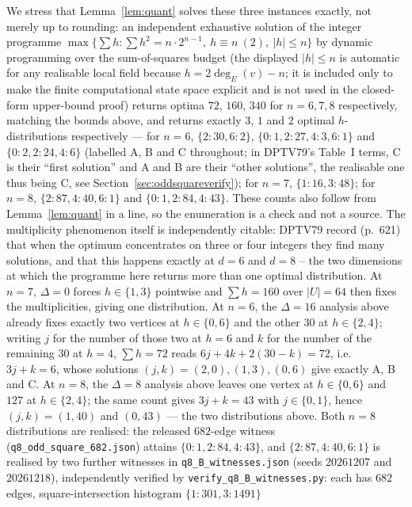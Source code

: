 \documentclass[12pt,a4paper]{article}
\theoremstyle{definition}
\begin{document}
We stress that Lemma~\ref{lem:quant} solves these three instances
exactly, not merely up to rounding: an independent exhaustive solution
of the integer programme
$\max\{\sum h : \sum h^2=n\cdot2^{n-1},\ h\equiv n\ (2),\ |h|\le n\}$
by dynamic programming over the sum-of-squares budget (the displayed
$|h|\le n$ is automatic for any realisable local field because
$h=2\deg_E(v)-n$; it is included only to make the finite computational
state space explicit and is not used in the closed-form upper-bound proof) returns optima
$72$, $160$, $340$ for $n=6,7,8$ respectively, matching the bounds
above, and returns exactly $3$, $1$ and $2$ optimal $h$-distributions
respectively --- for $n=6$,
$\{2{:}30,6{:}2\}$, $\{0{:}1,2{:}27,4{:}3,6{:}1\}$ and
$\{0{:}2,2{:}24,4{:}6\}$ (labelled A, B and C throughout; in DPTV79's
Table~I terms, C is their ``first solution'' and A and B are their ``other
solutions'', the realisable one thus being C, see
Section~\ref{sec:oddsquareverify}); for $n=7$, $\{1{:}16,3{:}48\}$; for $n=8$,
$\{2{:}87,4{:}40,6{:}1\}$ and $\{0{:}1,2{:}84,4{:}43\}$.
These counts also follow from Lemma~\ref{lem:quant} in a line, so the
enumeration is a check and not a source. The multiplicity phenomenon itself
is independently citable: DPTV79 record (p.~621) that when the optimum
concentrates on three or four integers they find many solutions, and that
this happens exactly at $d=6$ and $d=8$ -- the two dimensions at which the
programme here returns more than one optimal distribution. At $n=7$, $\Delta=0$ forces
$h\in\{1,3\}$ pointwise and $\sum h=160$ over $|U|=64$ then fixes the
multiplicities, giving one distribution. At $n=6$, the $\Delta=16$ analysis
above already fixes exactly two vertices at $h\in\{0,6\}$ and the other
$30$ at $h\in\{2,4\}$; writing $j$ for the number of those two at $h=6$ and
$k$ for the number of the remaining $30$ at $h=4$, $\sum h=72$ reads
$6j+4k+2(30-k)=72$, i.e.\ $3j+k=6$, whose solutions
$(j,k)=(2,0),(1,3),(0,6)$ give exactly A, B and C. At
$n=8$, the $\Delta=8$ analysis above leaves one vertex at $h\in\{0,6\}$ and
$127$ at $h\in\{2,4\}$; the same count gives $3j+k=43$ with $j\in\{0,1\}$,
hence $(j,k)=(1,40)$ and $(0,43)$ --- the two distributions above. Both $n=8$
distributions are realised: the released $682$-edge witness
(\texttt{q8\_odd\_square\_682.json}) attains $\{0{:}1,2{:}84,4{:}43\}$,
and $\{2{:}87,4{:}40,6{:}1\}$ is realised by two further witnesses in
\texttt{q8\_B\_witnesses.json} (seeds $20261207$ and $20261218$),
independently verified by \texttt{verify\_q8\_B\_witnesses.py}:
each has $682$ edges, square-intersection histogram $\{1{:}301,3{:}1491\}$
\end{document}
